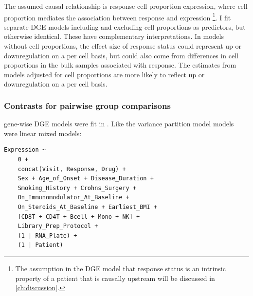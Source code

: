 The assumed causal relationship is response \textrightarrow cell proportion \textrightarrow expression, 
where cell proportion mediates the association between response and expression \footnote{
    The assumption in the \gls{DGE} model that response status is an intrinsic property of a patient that is causally upstream will be discussed in \autoref{ch:discussion}.
}.
I fit separate \gls{DGE} models including and excluding cell proportions as predictors, but otherwise identical.
These have complementary interpretations.
In models without cell proportions, the effect size of response status could represent up or downregulation on a per cell basis, 
but could also come from differences in cell proportions in the bulk samples associated with response.
The estimates from models adjusted for cell proportions are more likely to reflect up or downregulation on a per cell basis.


\subsubsection{Contrasts for pairwise group comparisons}

gene-wise \gls{DGE} models were fit in  \autocite{hoffman2020DreamPowerfulDifferential}.
Like the variance partition model models were linear mixed models:

\begin{lstlisting}
Expression ~ 
    0 + 
    concat(Visit, Response, Drug) + 
    Sex + Age_of_Onset + Disease_Duration + 
    Smoking_History + Crohns_Surgery + 
    On_Immunomodulator_At_Baseline + 
    On_Steroids_At_Baseline + Earliest_BMI +
    [CD8T + CD4T + Bcell + Mono + NK] + 
    Library_Prep_Protocol +
    (1 | RNA_Plate) +
    (1 | Patient)
\end{lstlisting}

